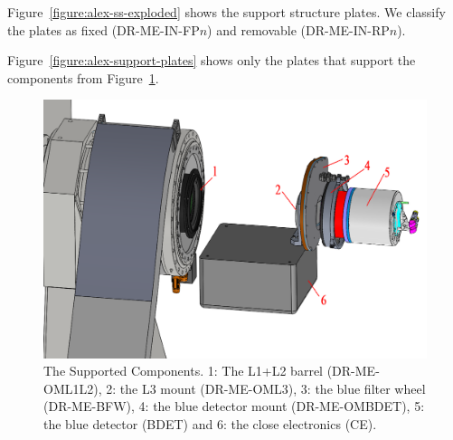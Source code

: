 \documentclass{article}
\begin{document}
Figure~\ref{figure:alex-ss-exploded} shows the support structure plates. We classify the plates as fixed (DR-ME-IN-FP$n$) and removable (DR-ME-IN-RP$n$).

Figure~\ref{figure:alex-support-plates} shows only the plates that support the components from Figure~\ref{figure:alex-supported-components}.

\begin{figure}[p]
\begin{center}
\includegraphics[width=\linewidth]{newfigures/Fig3_1.png}
\end{center}
\caption[The Supported Components]{The Supported Components. 1: The L1+L2 barrel (DR-ME-OML1L2), 2: the L3 mount (DR-ME-OML3), 3: the blue filter wheel (DR-ME-BFW), 4: the blue detector mount (DR-ME-OMBDET), 5: the blue detector (BDET) and 6: the close electronics (CE).}
\label{figure:alex-supported-components}
\end{figure}
\end{document}
